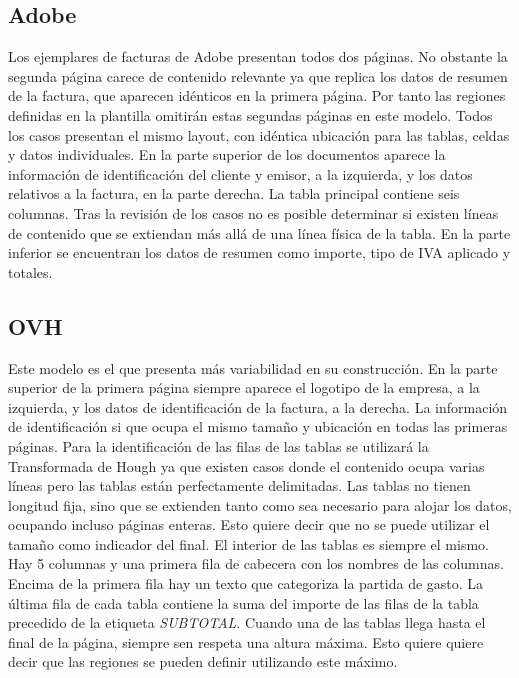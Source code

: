\subsection{Adobe}

Los ejemplares de facturas de Adobe presentan todos dos páginas. No obstante la segunda página carece de contenido relevante ya que replica los datos de resumen de la factura, que aparecen idénticos en la primera página. Por tanto las regiones definidas en la plantilla omitirán estas segundas páginas en este modelo.
Todos los casos presentan el mismo layout, con idéntica ubicación para las tablas, celdas y datos individuales. En la parte superior de los documentos aparece la información de identificación del cliente y emisor, a la izquierda, y los datos relativos a la factura, en la parte derecha.
La tabla principal contiene seis columnas. Tras la revisión de los casos no es posible determinar si existen líneas de contenido que se extiendan más allá de una línea física de la tabla.
En la parte inferior se encuentran los datos de resumen como importe, tipo de IVA aplicado y totales.

\subsection{OVH}

Este modelo es el que presenta más variabilidad en su construcción. En la parte superior de la primera página siempre aparece el logotipo de la empresa, a la izquierda, y los datos de identificación de la factura, a la derecha. La información de identificación si que ocupa el mismo tamaño y ubicación en todas las primeras páginas. Para la identificación de las filas de las tablas se utilizará la Transformada de Hough ya que existen casos donde el contenido ocupa varias líneas pero las tablas están perfectamente delimitadas. Las tablas no tienen longitud fija, sino que se extienden tanto como sea necesario para alojar los datos, ocupando incluso páginas enteras. Esto quiere decir que no se puede utilizar el tamaño como indicador del final. El interior de las tablas es siempre el mismo. Hay 5 columnas y una primera fila de cabecera con los nombres de las columnas. Encima de la primera fila hay un texto que categoriza la partida de gasto. La última fila de cada tabla contiene la suma del importe de las filas de la tabla precedido de la etiqueta \emph{SUBTOTAL}. Cuando una de las tablas llega hasta el final de la página, siempre sen respeta una altura máxima. Esto quiere quiere decir que las regiones se pueden definir utilizando este máximo.

